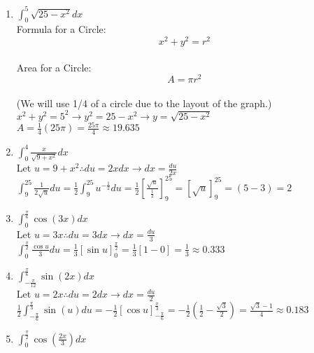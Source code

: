 \documentclass[10pt, letterpaper]{report}
\begin{document}
\begin{enumerate}
  \item{$\int_{0}^{5}\sqrt{25-x^2}dx$} \\

    Formula for a Circle: \[ x^2+y^2=r^2 \] \\

    Area for a Circle: \[ A=\pi r^2 \] \\

    (We will use 1/4 of a circle due to the layout of the graph.) \\

    $x^2+y^2=5^2\rightarrow y^2=25-x^2\rightarrow y=\sqrt{25-x^2}$ \\

    $A=\frac{1}{4}(25\pi)=\frac{25\pi}{4}\approx 19.635$ \\

  \item{$\int_{0}^{4}\frac{x}{\sqrt{9+x^2}}dx$} \\

    Let $u=9+x^2\therefore du=2xdx\rightarrow dx=\frac{du}{2x}$ \\

    $\int_{9}^{25}\frac{1}{2\sqrt{u}}du=
    \frac{1}{2}\int_{9}^{25}u^{-\frac{1}{2}}du=
    \frac{1}{2}[\frac{\sqrt{u}}{\frac{1}{2}}]_{9}^{25}=
    [\sqrt{u}]_{9}^{25}=(5-3)=2$ \\

  \item{$\int_{0}^{\frac{\pi}{6}}\cos(3x)dx$} \\

    Let $u=3x\therefore du=3dx \rightarrow dx=\frac{du}{3}$ \\

    $\int_{0}^{\frac{\pi}{2}}\frac{\cos{u}}{3}du=
    \frac{1}{3}[\sin{u}]_{0}^{\frac{\pi}{2}}=
    \frac{1}{3}[1-0]=\frac{1}{3}\approx 0.333$ \\

  \item{$\int_{-\frac{\pi}{12}}^{\frac{\pi}{6}}\sin{(2x)}dx$} \\

    Let $u=2x\therefore du=2dx\rightarrow dx=\frac{du}{2}$ \\

    $\frac{1}{2}\int_{-\frac{\pi}{6}}^{\frac{\pi}{3}}\sin{(u)}du=
    -\frac{1}{2}[\cos{u}]_{-\frac{\pi}{6}}^{\frac{\pi}{3}}=
    -\frac{1}{2}(\frac{1}{2}-\frac{\sqrt{3}}{2})=
    \frac{\sqrt{3}-1}{4}\approx 0.183$ \\
  \item{$\int_{0}^{\frac{\pi}{2}}\cos{(\frac{2x}{3})}dx$} \\


\end{enumerate}
\end{document}
